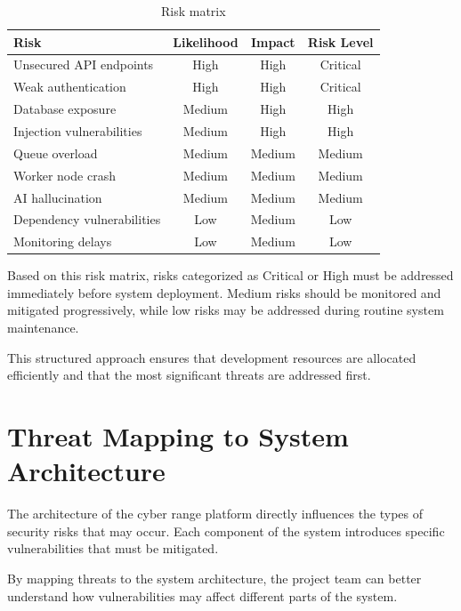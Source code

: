 \begin{table}[H]
    \centering
    \renewcommand{\arraystretch}{1.2}
    \begin{tabularx}{\textwidth}{|X|c|c|c|}
        \hline
        \textbf{Risk} & \textbf{Likelihood} & \textbf{Impact} & \textbf{Risk Level} \\
        \hline
        Unsecured API endpoints & High & High & Critical \\
        \hline
        Weak authentication & High & High & Critical \\
        \hline
        Database exposure & Medium & High & High \\
        \hline
        Injection vulnerabilities & Medium & High & High \\
        \hline
        Queue overload & Medium & Medium & Medium \\
        \hline
        Worker node crash & Medium & Medium & Medium \\
        \hline
        AI hallucination & Medium & Medium & Medium \\
        \hline
        Dependency vulnerabilities & Low & Medium & Low \\
        \hline
        Monitoring delays & Low & Medium & Low \\
        \hline
    \end{tabularx}
    \caption{Risk matrix}
\end{table}

Based on this risk matrix, risks categorized as Critical or High must be addressed immediately before system deployment. Medium risks should be monitored and mitigated progressively, while low risks may be addressed during routine system maintenance.

This structured approach ensures that development resources are allocated efficiently and that the most significant threats are addressed first.

\section{Threat Mapping to System Architecture}
The architecture of the cyber range platform directly influences the types of security risks that may occur. Each component of the system introduces specific vulnerabilities that must be mitigated.

By mapping threats to the system architecture, the project team can better understand how vulnerabilities may affect different parts of the system.

